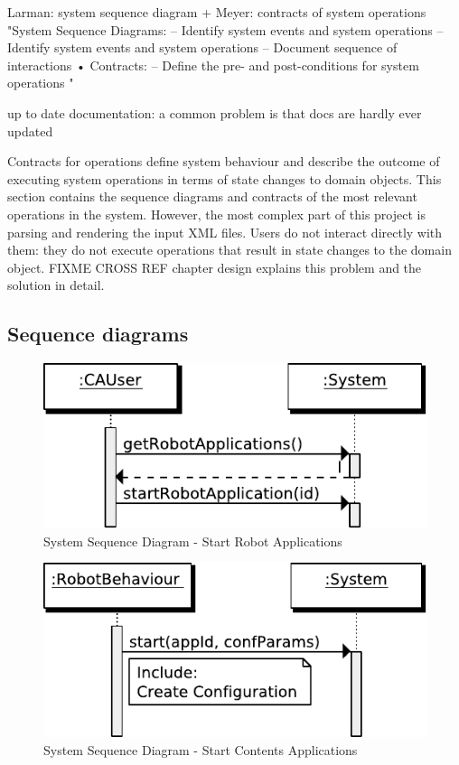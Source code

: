 Larman: system sequence diagram + Meyer: contracts of system operations
"System Sequence Diagrams:
–
Identify system events and system operations
–
Identify system events and system operations
– Document sequence of interactions
• Contracts:
– Define the pre- and post-conditions for system
operations "

up to date documentation: a common problem is that docs are hardly ever updated

Contracts for operations define system behaviour and describe the outcome of executing system operations in terms of state changes to domain objects.
This section contains the sequence diagrams and contracts of the most relevant operations in the system.
However, the most complex part of this project is parsing and rendering the input \ac{XML} files.
Users do not interact directly with them: they do not execute operations that result in state changes to the domain object.
FIXME CROSS REF chapter design explains this problem and the solution in detail.

\subsection{Sequence diagrams}
\begin{figure}[htb]
    \centering
    \includegraphics{figures/spec-seq-start-qtapp.pdf}
    \caption{System Sequence Diagram - Start Robot Applications}
    \label{fig:spec-start-qtapp}
\end{figure}

\begin{figure}[htb]
    \centering
    \includegraphics{figures/spec-seq-start-contents-app.pdf}
    \caption{System Sequence Diagram - Start Contents Applications}
    \label{fig:spec-start-ca}
\end{figure}

